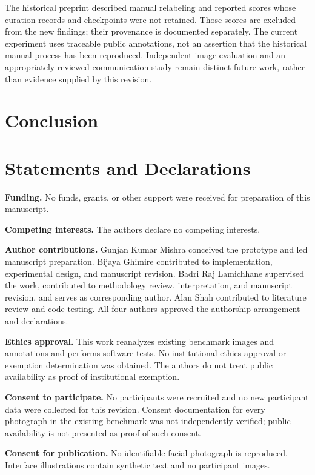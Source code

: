 \documentclass[pdflatex,sn-mathphys-num]{sn-jnl}
\begin{document}
The historical preprint described manual relabeling and reported scores whose curation records and checkpoints were not retained. Those scores are excluded from the new findings; their provenance is documented separately. The current experiment uses traceable public annotations, not an assertion that the historical manual process has been reproduced. Independent-image evaluation and an appropriately reviewed communication study remain distinct future work, rather than evidence supplied by this revision.

\section{Conclusion}



\backmatter
\section*{Statements and Declarations}
\noindent\textbf{Funding.} No funds, grants, or other support were received for preparation of this manuscript.

\noindent\textbf{Competing interests.} The authors declare no competing interests.

\noindent\textbf{Author contributions.} Gunjan Kumar Mishra conceived the prototype and led manuscript preparation. Bijaya Ghimire contributed to implementation, experimental design, and manuscript revision. Badri Raj Lamichhane supervised the work, contributed to methodology review, interpretation, and manuscript revision, and serves as corresponding author. Alan Shah contributed to literature review and code testing. All four authors approved the authorship arrangement and declarations.

\noindent\textbf{Ethics approval.} This work reanalyzes existing benchmark images and annotations and performs software tests. No institutional ethics approval or exemption determination was obtained. The authors do not treat public availability as proof of institutional exemption.

\noindent\textbf{Consent to participate.} No participants were recruited and no new participant data were collected for this revision. Consent documentation for every photograph in the existing benchmark was not independently verified; public availability is not presented as proof of such consent.

\noindent\textbf{Consent for publication.} No identifiable facial photograph is reproduced. Interface illustrations contain synthetic text and no participant images.
\end{document}
